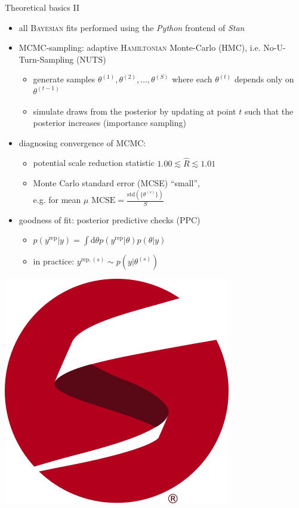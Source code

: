 \documentclass[11pt,aspectratio=169,dvipsnames]{beamer}
\begin{document}
	\begin{frame}{Theoretical basics II}
	\begin{itemize}
		
		\item<1-> all \textsc{Bayesian} fits performed using the \emph{Python} frontend of \emph{Stan}
		\vspace{0.2cm}
		\item<2-> MCMC-sampling: adaptive \textsc{Hamiltonian} Monte-Carlo (HMC), i.e. No-U-Turn-Sampling (NUTS)
		\begin{itemize}
			\item generate samples $\theta^{(1)},\theta^{(2)},\dots,\theta^{(S)}$ where each $\theta^{(t)}$ depends only on $\theta^{(t-1)}$
			\item simulate draws from the posterior by updating at point $t$ such that the posterior increases (importance sampling)
		\end{itemize}
		\vspace{0.2cm}
		\item<3-> diagnosing convergence of MCMC:
		\begin{itemize}
			\item potential scale reduction statistic $1.00\lesssim\widehat{R}\lesssim1.01$
			\item Monte Carlo standard error (MCSE) \enquote{small}, \\e.g. for mean $\mu$ $\text{MCSE}=\frac{\text{std}(\{\theta^{(s)}\})}{S}$
		\end{itemize}
	\vspace{0.2cm}
		\item<4-> goodness of fit: posterior predictive checks (PPC)
		\begin{itemize}
			\item $p(y^\text{rep}|y)=\int\text{d}\theta p(y^\text{rep}|\theta)p(\theta|y)$
			\item in practice: $y^{\text{rep}, (s)}\sim p(y|\theta^{(s)})$
		\end{itemize}
	\end{itemize}
	
	\begin{flushright}
		\vspace{-0.6cm}
		\includegraphics[width=.1\linewidth]{figs/logo-tm.png}\\
		\cites{stan,nuts}
	\end{flushright}
\end{frame}
\end{document}
